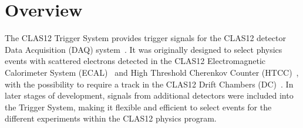 \section{Overview}

The CLAS12 Trigger System provides trigger signals for the CLAS12 detector Data Acquisition (DAQ)
system~\cite{daq-ref}. It was originally designed to select physics events with scattered electrons detected
in the CLAS12 Electromagnetic Calorimeter System (ECAL)~\cite{ec-ref} and High Threshold Cherenkov
Counter (HTCC)~\cite{htcc-ref}, with the possibility to require a track in the CLAS12 Drift Chambers
(DC)~\cite{dc-ref}. In later stages of development, signals from additional detectors were included into
the Trigger System, making it flexible and efficient to select events for the different experiments within
the CLAS12 physics program.



